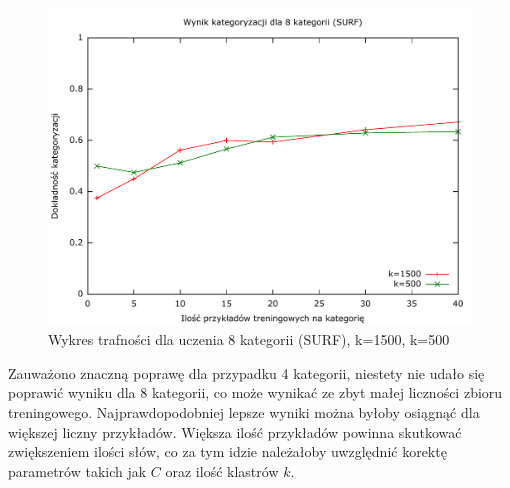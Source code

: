 \begin{figure}[h]
	\centering
	\includegraphics[scale=0.8]{graphics/04_interpretacja_wynikow/result-surf-8-1500-500.pdf}
	\caption{ Wykres trafności dla uczenia 8 kategorii (SURF), k=1500, k=500 }
	\label{fig:result-surf-8-1500-500}
\end{figure}

Zauważono znaczną poprawę dla przypadku 4 kategorii, niestety nie udało się poprawić wyniku dla 8 kategorii, co może wynikać ze zbyt małej liczności zbioru treningowego. Najprawdopodobniej lepsze wyniki można byłoby osiągnąć dla większej liczny przykładów. Większa ilość przykładów powinna skutkować zwiększeniem ilości słów, co za tym idzie należałoby uwzględnić korektę parametrów takich jak $C$ oraz ilość klastrów $k$.